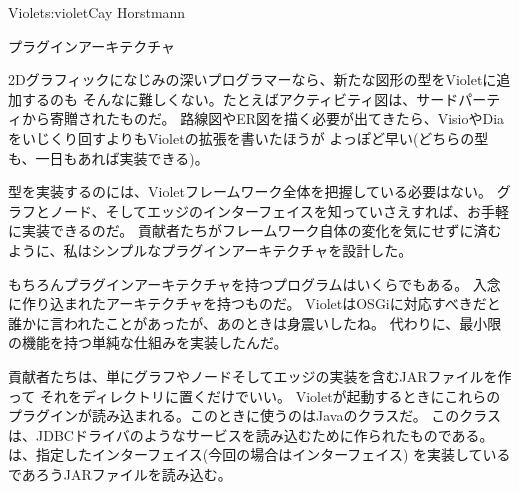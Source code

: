 \begin{aosachapter}{Violet}{s:violet}{Cay Horstmann}
\begin{aosasect1}{プラグインアーキテクチャ}

2Dグラフィックになじみの深いプログラマーなら、新たな図形の型をVioletに追加するのも
そんなに難しくない。たとえばアクティビティ図は、サードパーティから寄贈されたものだ。
路線図やER図を描く必要が出てきたら、VisioやDiaをいじくり回すよりもVioletの拡張を書いたほうが
よっぽど早い(どちらの型も、一日もあれば実装できる)。

型を実装するのには、Violetフレームワーク全体を把握している必要はない。
グラフとノード、そしてエッジのインターフェイスを知っていさえすれば、お手軽に実装できるのだ。
貢献者たちがフレームワーク自体の変化を気にせずに済むように、私はシンプルなプラグインアーキテクチャを設計した。

もちろんプラグインアーキテクチャを持つプログラムはいくらでもある。
入念に作り込まれたアーキテクチャを持つものだ。
VioletはOSGiに対応すべきだと誰かに言われたことがあったが、あのときは身震いしたね。
代わりに、最小限の機能を持つ単純な仕組みを実装したんだ。

貢献者たちは、単にグラフやノードそしてエッジの実装を含むJARファイルを作って
それをディレクトリに置くだけでいい。
Violetが起動するときにこれらのプラグインが読み込まれる。このときに使うのはJavaのクラスだ。
このクラスは、JDBCドライバのようなサービスを読み込むために作られたものである。
は、指定したインターフェイス(今回の場合はインターフェイス)
を実装しているであろうJARファイルを読み込む。


\end{aosasect1}
\end{aosachapter}
